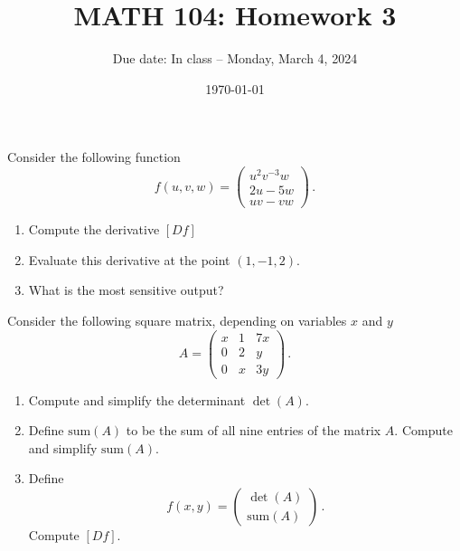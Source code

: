 \documentclass[12pt]{amsart}
\title{ MATH 104: Homework 3}
\author{Due date: In class -- Monday, March 4, 2024}
\date{\today}
\begin{document}
\maketitle

\begin{problem}
    Consider the following function
    \begin{equation*}
        f(u,v,w) = \begin{pmatrix}
            u^2 v^{-3} w \\ 2u - 5w \\ uv - vw
        \end{pmatrix} \,.
    \end{equation*}
    \begin{enumerate}
        \item Compute the derivative $[Df]$
        \item Evaluate this derivative at the point $(1, -1, 2)$.
        \item What is the most sensitive output?
    \end{enumerate}
\end{problem}

\begin{problem}
    Consider the following square matrix, depending on variables $x$ and $y$
    \begin{equation*}
        A = 
        \begin{pmatrix}
            x & 1 & 7x \\
            0 & 2 & y \\
            0 & x & 3y
        \end{pmatrix} \,.
    \end{equation*}
    \begin{enumerate}
        \item Compute and simplify the determinant $\det(A)$.
        \item Define $\mathrm{sum}(A)$ to be the sum of all nine entries of the
            matrix $A$. Compute and simplify $\mathrm{sum}(A)$.
        \item Define 
            $$ f(x,y) = \begin{pmatrix}
                \det(A) \\
                \mathrm{sum}(A)
            \end{pmatrix}\,.$$
            Compute $[Df]$.
    \end{enumerate}
\end{problem}
\end{document}
